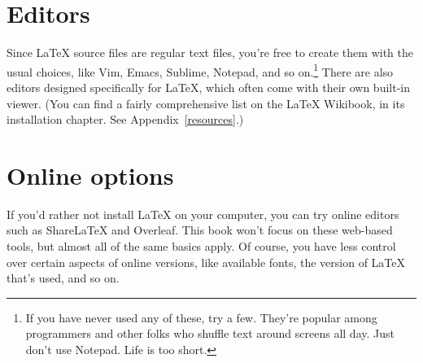 \section{Editors}

Since \LaTeX{} source files are regular text files,
you're free to create them with the usual choices, like Vim, Emacs,
Sublime, Notepad\plusplus, and so on.\punckern\footnote{If you have never used
any of these, try a few.
They're popular among programmers and other folks who shuffle text around
screens all day. Just don't use Notepad. Life is too short.}
There are also editors designed specifically for \LaTeX{},
which often come with their own built-in  viewer.
(You can find a fairly comprehensive list on the \LaTeX{} Wikibook,
in its installation chapter. See Appendix~\ref{resources}.)

\section{Online options}

If you'd rather not install \LaTeX{} on your computer,
you can try online editors such as Share\LaTeX{} and Overleaf.
This book won't focus on these web-based tools,
but almost all of the same basics apply.
Of course, you have less control over certain aspects of online versions,
like available fonts, the version of \LaTeX{} that's used, and so on.
